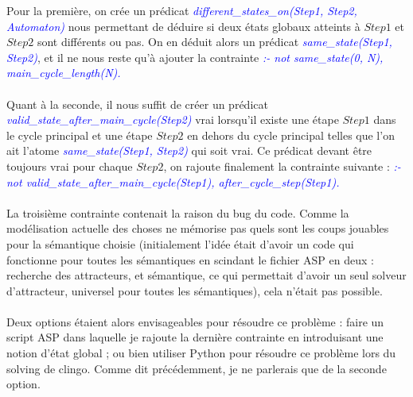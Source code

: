 \documentclass[12pt,a4paper]{article}
\begin{document}
Pour la première, on crée un prédicat \textcolor{blue}{\emph{different\_states\_on(Step1, Step2, Automaton)}} nous permettant de déduire si deux états globaux atteints à $Step1$ et $Step2$ sont différents ou pas. On en déduit alors 
un prédicat \textcolor{blue}{\emph{same\_state(Step1, Step2)}}, et il ne nous reste qu'à ajouter la contrainte \textcolor{blue}{\emph{:- not same\_state(0, N), main\_cycle\_length(N).}}\\ \\
Quant à la seconde, il nous suffit de créer un prédicat \textcolor{blue}{\emph{valid\_state\_after\_main\_cycle(Step2)}} vrai lorsqu'il existe une étape $Step1$ dans le cycle principal et une étape $Step2$ en dehors du cycle 
principal telles que l'on ait l'atome \textcolor{blue}{\emph{same\_state(Step1, Step2)}} qui soit vrai. Ce prédicat devant être toujours vrai pour chaque $Step2$, on rajoute finalement la contrainte suivante : 
\textcolor{blue}{\emph{:- not valid\_state\_after\_main\_cycle(Step1), after\_cycle\_step(Step1).}}\\ \\
La troisième contrainte contenait la raison du bug du code. Comme la modélisation actuelle des choses ne mémorise pas quels sont les coups jouables pour la sémantique choisie (initialement l'idée était d'avoir un code qui fonctionne 
pour toutes les sémantiques en scindant le fichier ASP en deux : recherche des attracteurs, et sémantique, ce qui permettait d'avoir un seul solveur d'attracteur, universel pour toutes les sémantiques), cela n'était pas 
possible.\\ \\
Deux options étaient alors envisageables pour résoudre ce problème : faire un script ASP dans laquelle je rajoute la dernière contrainte en introduisant une notion d'état global ; ou bien utiliser Python pour résoudre ce problème 
lors du solving de clingo. Comme dit précédemment, je ne parlerais que de la seconde option.
\end{document}
